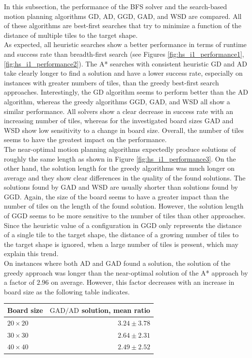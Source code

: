 In this subsection, the performance of the BFS solver and the search-based motion planning algorithms GD, AD, GGD, GAD, and WSD are compared. All of these algorithms are best-first searches that try to minimize a function of the distance of multiple tiles to the target shape.\\
As expected, all heuristic searches show a better performance in terms of runtime and success rate than breadth-first search (see Figures \ref{fig:hs_i1_performance1}, \ref{fig:hs_i1_performance2}). The A* searches with consistent heuristic GD and AD take clearly longer to find a solution and have a lower success rate, especially on instances with greater numbers of tiles, than the greedy best-first search approaches. Interestingly, the GD algorithm seems to perform better than the AD algorithm, whereas the greedy algorithms GGD, GAD, and WSD all show a similar performance. All solvers show a clear decrease in success rate with an increasing number of tiles, whereas for the investigated board sizes GAD and WSD show low sensitivity to a change in board size. Overall, the number of tiles seems to have the greatest impact on the performance. \\
The near-optimal motion planning algorithms expectedly produce solutions of roughly the same length as shown in Figure \ref{fig:hs_i1_performance3}. On the other hand, the solution length for the greedy algorithms was much longer on average and they show clear differences in the quality of the found solutions. The solutions found by GAD and WSD are usually shorter than solutions found by GGD. Again, the size of the board seems to have a greater impact than the number of tiles on the length of the found solution.
However, the solution length of GGD seems to be more sensitive to the number of tiles than other approaches. Since the heuristic value of a configuration in GGD only represents the distance of a single tile to the target shape, the distance of a growing number of tiles to the target shape is ignored, when a large number of tiles is present, which may explain this trend.\\
On instances where both AD and GAD found a solution, the solution of the greedy approach was longer than the near-optimal solution of the A* approach by a factor of $2.96$ on average. However, this factor decreases with an increase in board size as the following table indicates. \\

\begin{center}
\begin{tabular}{ |l|r| }
\hline
Board size & $\text{GAD} / \text{AD}$ solution, mean ratio\\
\hline
$20 \times 20$ & $3.24 \pm 3.78$ \\
\hline
$30 \times 30$ & $2.64 \pm 2.31$ \\
\hline
$40 \times 40$ & $2.49 \pm 2.52$ \\
\hline
\end{tabular}
\end{center}

